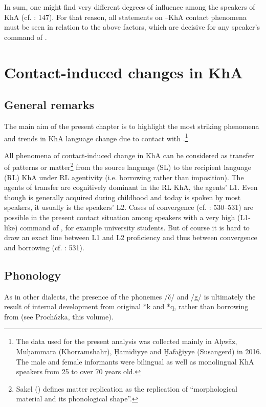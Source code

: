 \documentclass[output=paper,nonflat]{langsci/langscibook}
\begin{document}
In sum, one might find very different degrees of  influence among the speakers of KhA (cf. \citealt{MatrasShabibi2007}: 147). For that reason, all statements on –KhA contact phenomena must be seen in relation to the above factors, which are decisive for any speaker’s command of . 

\section{Contact-induced changes in KhA}\largerpage
\subsection{General remarks}
The main aim of the present chapter is to highlight the most striking phenomena and trends in KhA {language change} due to contact with .\footnote{The data used for the present analysis was collected mainly in Aḥwāz, Muḥammara (Khorramshahr), Ḥamīdiyye and Ḫafaǧiyye (Susangerd) in 2016. The male and female informants were bilingual as well as {monolingual} KhA speakers from 25 to over 70 years old.}

All phenomena of contact-induced change in KhA can be considered as {transfer} of patterns or matter\footnote{Sakel (\citeyear[15]{Sakel2007}) defines matter {replication} as the {replication} of “morphological material and its phonological shape”.} from the {source language} ({SL})  to the {recipient language} ({RL}) KhA under {RL} agentivity (i.e. borrowing rather than {imposition}).{} The agents of {transfer} are cognitively dominant in the {RL} KhA, the agents’ L1. Even though  is generally acquired during childhood and today is spoken by most speakers, it usually is the speakers’ L2. Cases of {convergence} (cf. \citealt{Lucas2015}: 530–531) are possible in the present contact situation among speakers with a very high (L1-like) command of , for example university students. But of course it is hard to draw an exact line between L1 and L2 proficiency and thus between {convergence} and borrowing (cf. \citealt{Lucas2015}: 531). 



\subsection{Phonology}
As in other   dialects, the presence of the phonemes /č/ and /g/ is ultimately the result of internal development from original *k and *q, rather than borrowing from  (see Procházka, this volume).
\end{document}
